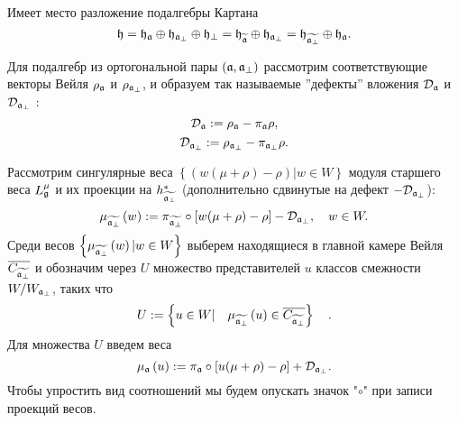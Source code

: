 Имеет место разложение подалгебры Картана
\begin{equation}
\mathfrak{h}=\frak{\mathfrak{h}_{\mathfrak{a}}}\oplus \mathfrak{h}_{\mathfrak{a}_{\perp}}\oplus
\mathfrak{h}_{\perp }=\frak{\mathfrak{h}_{\widetilde{\mathfrak{a}}}}\oplus \mathfrak{h}_{\mathfrak{a}_{\perp}}=\frak{\mathfrak{h}_{\widetilde{\mathfrak{a}_{\perp}}}}\oplus
\mathfrak{h}_{\mathfrak{a}}.
\end{equation}

Для подалгебр из ортогональной пары  $\left( \mathfrak{a},\mathfrak{a}_{\perp}\right) $ рассмотрим соответствующие векторы Вейля $\rho _{\mathfrak{a}}$ и $\rho _{\mathfrak{a}_{\perp }}$, и образуем так называемые  ''дефекты'' вложения $\mathcal{D}_{\mathfrak{a}}$ и $\mathcal{D}_{\mathfrak{a}_{\perp }}$ :
\begin{equation}
\mathcal{D}_{\mathfrak{a}}:=\rho _{\mathfrak{a}}-\pi _{\mathfrak{a}}\rho ,
\end{equation}
\begin{equation}
\label{defect-perp}
\mathcal{D}_{\mathfrak{a}_{\perp }}:=\rho _{\mathfrak{a}_{\perp }}-\pi_{\mathfrak{a}_{\perp}}\rho .
\end{equation}

Рассмотрим сингулярные веса  $\left\{\left( w(\mu +\rho )-\rho \right)|w  \in W \right\}$  модуля старшего веса  $L_{\mathfrak{g}}^{\mu }$ и их проекции на $h_{\widetilde{\mathfrak{a}_{\perp }}}^{\ast }$ (дополнительно сдвинутые на дефект $-\mathcal{D}_{\mathfrak{a}_{\perp }}$):
\begin{equation*}
\mu _{\widetilde{\af_{\perp }}}\left( w\right) :=\pi _{\widetilde{\frak{%
a}_{\perp }}}\circ\left[ w(\mu +\rho )-\rho \right] -\mathcal{D}_{\af_{\perp
}},\quad w\in W.
\end{equation*}
Среди весов  $\left\{\mu _{\widetilde{\mathfrak{a}_{\perp }}}\left( w\right)|w\in W\right\}$ выберем находящиеся в главной камере Вейля $\overline{C_{\widetilde{\mathfrak{a}_{\perp}}}}$ и обозначим через $U$ множество представителей $u$ классов смежности $W/W_{\mathfrak{a}_{\perp }}$, таких что
\begin{equation}
U:=\left\{ u\in W|\quad \mu _{\widetilde{\mathfrak{a}_{\perp }}}\left( u\right)
\in \overline{C_{\widetilde{\mathfrak{a}_{\perp }}}}\right\} \quad .
\label{U-def}
\end{equation}
Для множества  $U$ введем веса
\begin{equation*}
\mu _{\af}\left( u\right) :=\pi _{\af}\circ\left[ u(\mu +\rho )-\rho %
\right] +\mathcal{D}_{\af_{\perp }}.
\end{equation*}
Чтобы упростить вид соотношений мы будем опускать значок "$\circ$" при записи проекций весов.

